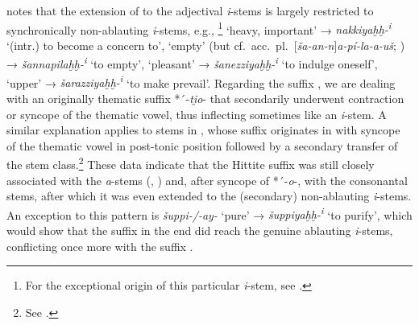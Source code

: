 \documentclass[output=paper,colorlinks,citecolor=brown]{langscibook}
\begin{document}
\citet[29--30]{Koch1973} notes that the extension of  to the adjectival \textit{i}-stems is largely restricted to synchronically non-ablauting \textit{i}-stems, e.g., \footnote{For the exceptional origin of this particular \textit{i}-stem, see \citealt{Widmer2005}.} ‘heavy, important’ → \textit{nakkiyaḫḫ-\textsuperscript{i}} ‘(intr.) to become a concern to’,  ‘empty’ (but cf.\ acc.\ pl.\ [\textit{ša-an-n}]\textit{a-pí-la-a-uš}; ) → \textit{šannapilaḫḫ-\textsuperscript{i}} ‘to empty’,  ‘pleasant’ → \textit{šanezziyaḫḫ-\textsuperscript{i}} ‘to indulge oneself’,  ‘upper’ → \textit{šarazziyaḫḫ-\textsuperscript{i}} ‘to make prevail’. Regarding the suffix , we are dealing with an originally thematic suffix *´-\textit{ti̯o}- that secondarily underwent contraction or syncope of the thematic vowel, thus inflecting sometimes like an \textit{i}-stem. A similar explanation applies to stems in , whose suffix originates in  with syncope of the thematic vowel in post-tonic position followed by a secondary transfer of the stem class.\footnote{See \citealt{Rieken2008}.} These data indicate that the Hittite  suffix \mbox{} was still closely associated with the \textit{a}-stems (, ) and, after syncope of *´-\textit{o}-, with the consonantal stems, after which it was even extended to the (secondary) non-ablauting \textit{i}-stems. An exception to this pattern is \textit{šuppi-/-ay-} ‘pure’ → \textit{šuppiyaḫḫ-\textsuperscript{i}} ‘to purify’, which would show that the  suffix in the end did reach the genuine ablauting \textit{i}-stems, conflicting once more with the  suffix .
\end{document}
